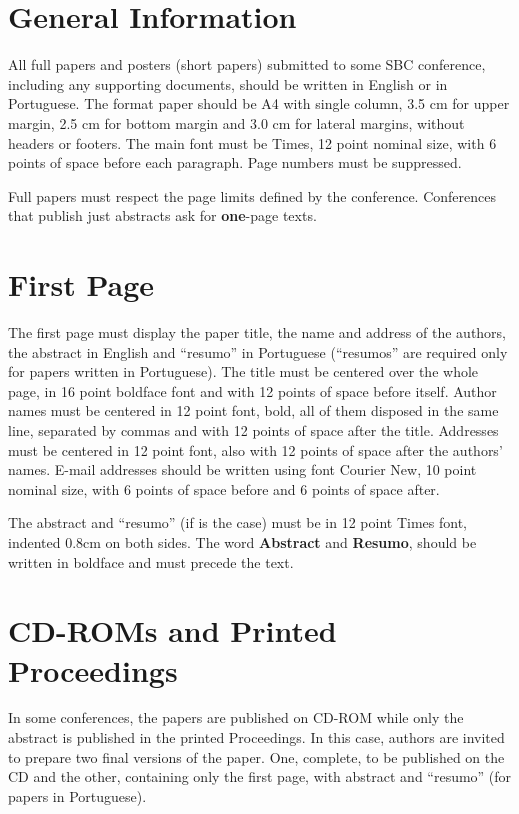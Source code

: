 \documentclass[12pt]{article}
\begin{document}
	






\section{General Information}

All full papers and posters (short papers) submitted to some SBC conference,
including any supporting documents, should be written in English or in
Portuguese. The format paper should be A4 with single column, 3.5 cm for upper
margin, 2.5 cm for bottom margin and 3.0 cm for lateral margins, without
headers or footers. The main font must be Times, 12 point nominal size, with 6
points of space before each paragraph. Page numbers must be suppressed.

Full papers must respect the page limits defined by the conference.
Conferences that publish just abstracts ask for \textbf{one}-page texts.

\section{First Page} \label{sec:firstpage}

The first page must display the paper title, the name and address of the
authors, the abstract in English and ``resumo'' in Portuguese (``resumos'' are
required only for papers written in Portuguese). The title must be centered
over the whole page, in 16 point boldface font and with 12 points of space
before itself. Author names must be centered in 12 point font, bold, all of
them disposed in the same line, separated by commas and with 12 points of
space after the title. Addresses must be centered in 12 point font, also with
12 points of space after the authors' names. E-mail addresses should be
written using font Courier New, 10 point nominal size, with 6 points of space
before and 6 points of space after.

The abstract and ``resumo'' (if is the case) must be in 12 point Times font,
indented 0.8cm on both sides. The word \textbf{Abstract} and \textbf{Resumo},
should be written in boldface and must precede the text.

\section{CD-ROMs and Printed Proceedings}

In some conferences, the papers are published on CD-ROM while only the
abstract is published in the printed Proceedings. In this case, authors are
invited to prepare two final versions of the paper. One, complete, to be
published on the CD and the other, containing only the first page, with
abstract and ``resumo'' (for papers in Portuguese).
\end{document}
